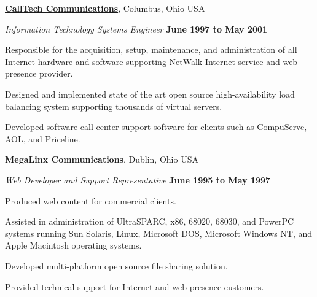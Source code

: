 \documentclass[10pt]{article}
\newenvironment{outerlist}[1][\enskip\textbullet]%
        {\begin{itemize}[#1]}{\end{itemize}%
         \vspace{-.6\baselineskip}}
\newenvironment{innerlist}[1][\enskip\textbullet]%
        {\begin{compactitem}[#1]}{\end{compactitem}}
\newcommand{\halfblankline}{\quad\vspace{-0.5\baselineskip}\pagebreak[3]}
\begin{document}
\halfblankline

\href{http://www.calltech.com/}{\textbf{CallTech Communications}},
Columbus, Ohio USA
\begin{outerlist}

\item[] \textit{Information Technology Systems Engineer}%
        \hfill \textbf{June 1997 to May 2001}
\begin{innerlist}
\item Responsible for the acquisition, setup, maintenance, and
        administration of all Internet hardware and software supporting
        \href{http://www.netwalk.com/}{NetWalk} Internet service
        and web presence provider.
\item Designed and implemented state of the art open source
        high-availability load balancing system supporting thousands of
        virtual servers.
\item Developed software call center support software for clients such
        as CompuServe, AOL, and Priceline.
\end{innerlist}

\end{outerlist}

\halfblankline

\textbf{MegaLinx Communications}, Dublin, Ohio USA
\begin{outerlist}

\item[] \textit{Web Developer and Support Representative}%
        \hfill \textbf{June 1995 to May 1997}
\begin{innerlist}
\item Produced web content for commercial clients.
\item Assisted in administration of UltraSPARC, x86, 68020, 68030, and
        PowerPC systems running Sun Solaris, Linux, Microsoft DOS,
        Microsoft Windows NT, and Apple Macintosh operating systems.
\item Developed multi-platform open source file sharing solution.
\item Provided technical support for Internet and web presence
        customers.
\end{innerlist}

\end{outerlist}
\end{document}
